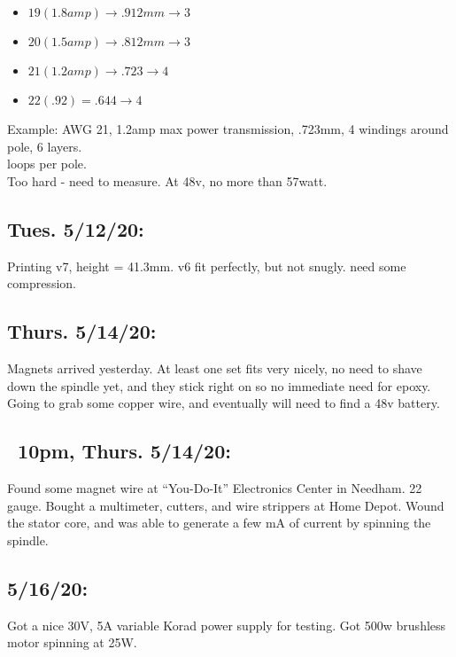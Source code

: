 \documentclass[11pt]{article} %
\begin{document}
\begin{itemize}
\item $19 (1.8amp) \rightarrow .912mm \rightarrow 3$
\item $20 (1.5amp) \rightarrow .812mm \rightarrow 3$
\item $21 (1.2amp) \rightarrow .723 \rightarrow 4$
\item $22 (.92) = .644 \rightarrow 4$
\end{itemize}

\noindent Example: AWG 21, 1.2amp max power transmission, .723mm, 4 windings around pole, 6 layers. \\

 loops per pole. \\

\noindent Too hard - need to measure. At 48v, no more than 57watt. \\

\subsection*{Tues. 5/12/20:} Printing v7, height = 41.3mm. v6 fit perfectly, but not snugly. need some compression. \\

\subsection*{Thurs. 5/14/20:} Magnets arrived yesterday. At least one set fits very nicely, no need to shave down the spindle yet, and they stick right on so no immediate need for epoxy. Going to grab some copper wire, and eventually will need to find a 48v battery. \\

\subsection*{~10pm, Thurs. 5/14/20:} Found some magnet wire at ``You-Do-It” Electronics Center in Needham. 22 gauge. Bought a multimeter, cutters, and wire strippers at Home Depot. Wound the stator core, and was able to generate a few mA of current by spinning the spindle. \\

\subsection*{5/16/20:} Got a nice 30V, 5A variable Korad power supply for testing. Got 500w brushless motor spinning at 25W. \\
\end{document}
